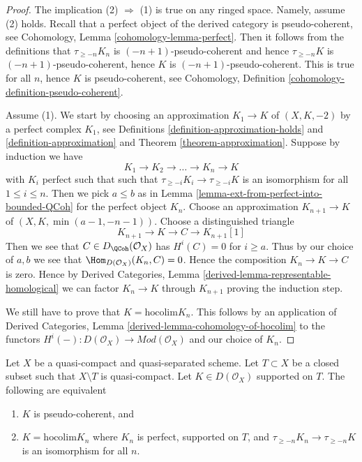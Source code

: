 \begin{proof}
The implication (2) $\Rightarrow$ (1) is true on any ringed space.
Namely, assume (2) holds. Recall that a perfect object of the derived
category is pseudo-coherent, see
Cohomology, Lemma \ref{cohomology-lemma-perfect}.
Then it follows from the definitions that
$\tau_{\geq -n}K_n$ is $(-n + 1)$-pseudo-coherent
and hence $\tau_{\geq -n}K$ is $(-n + 1)$-pseudo-coherent,
hence $K$ is $(-n + 1)$-pseudo-coherent. This is true for
all $n$, hence $K$ is pseudo-coherent, see
Cohomology, Definition \ref{cohomology-definition-pseudo-coherent}.

\medskip\noindent
Assume (1). We start by choosing an approximation
$K_1 \to K$ of $(X, K, -2)$ by a perfect complex $K_1$, see
Definitions \ref{definition-approximation-holds} and
\ref{definition-approximation} and
Theorem \ref{theorem-approximation}.
Suppose by induction we have
$$
K_1 \to K_2 \to \ldots \to K_n \to K
$$
with $K_i$ perfect such that
such that $\tau_{\geq -i}K_i \to \tau_{\geq -i}K$ is an isomorphism
for all $1 \leq i \leq n$. Then we pick $a \leq b$ as in
Lemma \ref{lemma-ext-from-perfect-into-bounded-QCoh}
for the perfect object $K_n$. Choose an approximation
$K_{n + 1} \to K$ of $(X, K, \min(a - 1, -n - 1))$.
Choose a distinguished triangle
$$
K_{n + 1} \to K \to C \to K_{n + 1}[1]
$$
Then we see that $C \in D_\QCoh(\mathcal{O}_X)$ has
$H^i(C) = 0$ for $i \geq a$. Thus by our choice of $a, b$
we see that $\Hom_{D(\mathcal{O}_X)}(K_n, C) = 0$.
Hence the composition $K_n \to K \to C$ is zero. Hence by
Derived Categories, Lemma \ref{derived-lemma-representable-homological}
we can factor $K_n \to K$ through $K_{n + 1}$
proving the induction step.

\medskip\noindent
We still have to prove that $K = \text{hocolim} K_n$.
This follows by an application of
Derived Categories, Lemma \ref{derived-lemma-cohomology-of-hocolim}
to the functors
$H^i( - ) : D(\mathcal{O}_X) \to \textit{Mod}(\mathcal{O}_X)$
and our choice of $K_n$.
\end{proof}

\begin{lemma}
\label{lemma-pseudo-coherent-hocolim-with-support}
Let $X$ be a quasi-compact and quasi-separated scheme.
Let $T \subset X$ be a closed subset such that $X \setminus T$
is quasi-compact. Let $K \in D(\mathcal{O}_X)$ supported on $T$.
The following are equivalent
\begin{enumerate}
\item $K$ is pseudo-coherent, and
\item $K = \text{hocolim} K_n$ where
$K_n$ is perfect, supported on $T$, and
$\tau_{\geq -n}K_n \to \tau_{\geq -n}K$ is an isomorphism for all $n$.
\end{enumerate}
\end{lemma}

